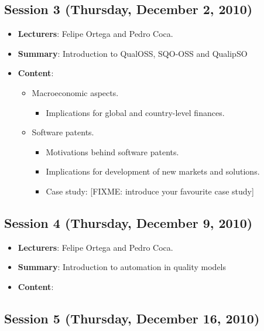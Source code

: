 \documentclass[a4paper]{article}
\begin{document}
\subsection{Session 3 (Thursday, December 2, 2010)}

\begin{itemize}
 \item \textbf{Lecturers}: Felipe Ortega and Pedro Coca.
 \item \textbf{Summary}: Introduction to QualOSS, SQO-OSS and QualipSO
 \item \textbf{Content}:

    \begin{itemize}
     \item Macroeconomic aspects.
      \begin{itemize}
       \item Implications for global and country-level finances.
       
      \end{itemize}

     \item Software patents.
	\begin{itemize}
	 \item Motivations behind software patents.
	 \item Implications for development of new markets and solutions.
         \item Case study: [FIXME: introduce your favourite case study]
	\end{itemize}

    \end{itemize}

\end{itemize}

\subsection{Session 4 (Thursday, December 9, 2010)}

\begin{itemize}
 \item \textbf{Lecturers}: Felipe Ortega and Pedro Coca.
 \item \textbf{Summary}: Introduction to automation in quality models
 \item \textbf{Content}:

   


\end{itemize}

\subsection{Session 5 (Thursday, December 16, 2010)}
\end{document}
